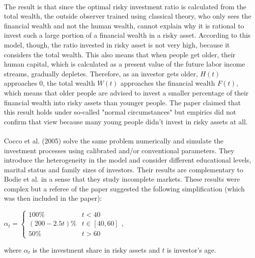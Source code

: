 \paragraph*{}The result is that since the optimal risky investment ratio is calculated from the total wealth, the outside observer trained using classical theory, who only sees the financial wealth and not the human wealth, cannot explain why it is rational to invest such a large portion of a financial wealth in a risky asset. According to this model, though, the ratio invested in risky asset is not very high, because it considers the total wealth. This also means that when people get older, their human capital, which is calculated as a present value of the future labor income streams, gradually depletes. Therefore, as an investor gets older, $H(t)$ approaches $0$, the total wealth $W(t)$ approaches the financial wealth $F(t)$, which means that older people are advised to invest a smaller percentage of their financial wealth into risky assets than younger people. The paper claimed that this result holds under so-called "normal circumstances" but empirics did not confirm that view because many young people didn't invest in risky assets at all. 

\paragraph*{}Cocco et al. (2005) solve the same problem numerically and simulate the investment processes using calibrated and/or conventional parameters. They introduce the heterogeneity in the model and consider different educational levels, marital status and family sizes of investors. Their results are complementary to Bodie et al. in a sense that they study incomplete markets. These results were complex but a referee of the paper suggested the following simplification (which was then included in the paper):

\begin{center}
	$\alpha_t = \begin{cases} 100\% & t<40\\(200-2.5t)\% & t\in[40,60]\\50\% & t>60 \end{cases}$,
\end{center}

where $\alpha_t$ is the investment share in risky assets and $t$ is investor's age.


